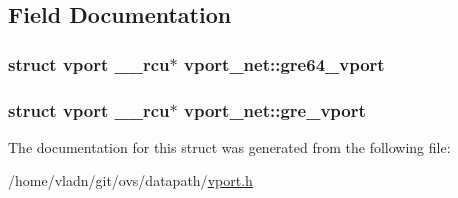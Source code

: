 \subsection{Field Documentation}
\hypertarget{structvport__net_ac907ad528610a5eb24f9889a51d23265}{}
\subsubsection[{gre64\+\_\+vport}]{\setlength{\rightskip}{0pt plus 5cm}struct {\bf vport} {\bf \+\_\+\+\_\+rcu}$\ast$ vport\+\_\+net\+::gre64\+\_\+vport}\label{structvport__net_ac907ad528610a5eb24f9889a51d23265}
\hypertarget{structvport__net_a25768f1cf01f5e719b93818fddc5c528}{}
\subsubsection[{gre\+\_\+vport}]{\setlength{\rightskip}{0pt plus 5cm}struct {\bf vport} {\bf \+\_\+\+\_\+rcu}$\ast$ vport\+\_\+net\+::gre\+\_\+vport}\label{structvport__net_a25768f1cf01f5e719b93818fddc5c528}


The documentation for this struct was generated from the following file\+:\begin{DoxyCompactItemize}
\item 
/home/vladn/git/ovs/datapath/\hyperlink{vport_8h}{vport.\+h}\end{DoxyCompactItemize}
